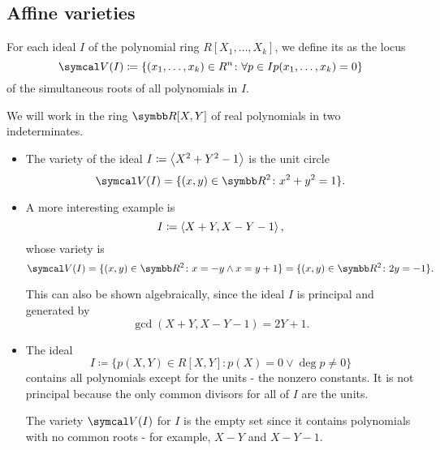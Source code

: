 \subsection{Affine varieties}\label{subsec:affine_varieties}

\begin{definition}\label{def:affine_variety}\cite[69]{Kocev2016}
  For each ideal \( I \) of the polynomial ring \( R[X_1, \ldots, X_k] \), we define its  as the locus
  \begin{equation*}
    \Cal{V}(I) \coloneqq \{ (x_1, \ldots, x_k) \in R^n \colon \forall p \in I p(x_1, \ldots, x_k) = 0 \}
  \end{equation*}
  of the simultaneous roots of all polynomials in \( I \).
\end{definition}

\begin{example}\label{ex:affine_varieties}
  We will work in the ring \( \R[X, Y] \) of real polynomials in two indeterminates.

  \begin{itemize}
    \item The variety of the ideal \( I \coloneqq \left\langle X^2 + Y^2 - 1 \right\rangle \) is the unit circle
    \begin{equation*}
      \Cal{V}(I) = \{ (x, y) \in \R^2 \colon x^2 + y^2 = 1 \}.
    \end{equation*}

    \item A more interesting example is
    \begin{equation*}
      I \coloneqq \left\langle X + Y, X - Y - 1 \right\rangle,
    \end{equation*}
    whose variety is
    \begin{equation*}
      \Cal{V}(I) = \{ (x, y) \in \R^2 \colon x = -y \land x = y + 1 \} = \{ (x, y) \in \R^2 \colon 2y = -1 \}.
    \end{equation*}

    This can also be shown algebraically, since the ideal \( I \) is principal and generated by
    \begin{equation*}
      \gcd(X + Y, X - Y - 1) = 2Y + 1.
    \end{equation*}

    \item The ideal
    \begin{equation*}
      I \coloneqq \{ p(X, Y) \in R[X, Y] \colon p(X) = 0 \lor \deg p \neq 0 \}
    \end{equation*}
    contains all polynomials except for the units - the nonzero constants. It is not principal because the only common divisors for all of \( I \) are the units.

    The variety \( \Cal{V}(I) \) for \( I \) is the empty set since it contains polynomials with no common roots - for example, \( X - Y \) and \( X - Y - 1 \).
  \end{itemize}
\end{example}

